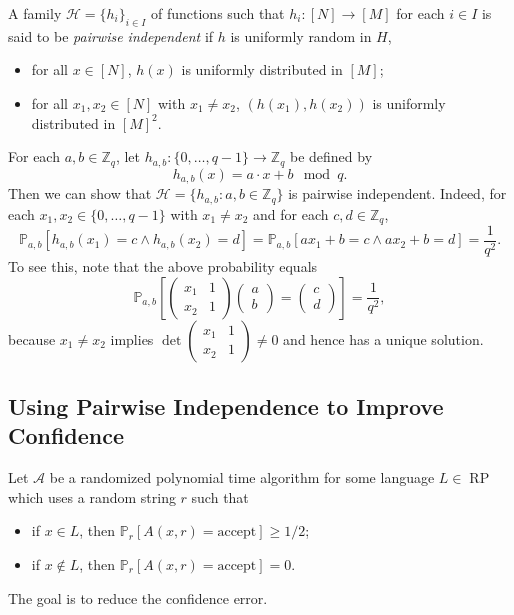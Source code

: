 \documentclass[letterpaper, reqno,11pt]{article}
\newcommand{\ZZ}{\mathbb{Z}}
\newcommand{\PP}{\mathbb{P}}
\DeclareMathOperator{\RP}{RP}
\begin{document}
\begin{definition}
  A family $\mathcal H = \{ h_i \}_{i \in I}$ of functions such that $h_i : [N] \to [M]$ for each $i \in I$ is said to be \emph{pairwise independent} if $h$ is uniformly random in $H$,
  \begin{itemize}[itemsep=0pt]
    \item for all $x \in [N]$, $h(x)$ is uniformly distributed in $[M]$;
    \item for all $x_1, x_2 \in [N]$ with $x_1 \neq x_2$, $(h(x_1), h(x_2))$ is uniformly distributed in $[M]^2$.
  \end{itemize}
\end{definition}

For each $a, b \in \ZZ_q$, let $h_{a, b} : \{ 0, \ldots, q - 1 \} \to \ZZ_q$ be defined by
$$ h_{a, b}(x) = a \cdot x + b \mod{q}. $$
Then we can show that $\mathcal H = \{ h_{a, b} : a, b \in \ZZ_q \}$ is pairwise independent. Indeed, for each $x_1, x_2 \in \{ 0, \ldots, q - 1 \}$ with $x_1 \neq x_2$ and for each $c, d \in \ZZ_q$,
$$ \PP_{a, b}\left[h_{a, b}\left(x_1\right) = c \wedge h_{a, b}\left(x_2\right) = d\right] = \PP_{a, b}\left[ax_1 + b = c \wedge ax_2 + b = d\right] = \frac{1}{q^2}. $$
To see this, note that the above probability equals
$$ \PP_{a, b}\left[\begin{pmatrix}
  x_1 & 1 \\
  x_2 & 1
\end{pmatrix} \begin{pmatrix}
  a \\
  b
\end{pmatrix} = \begin{pmatrix}
  c \\
  d
\end{pmatrix}\right] = \frac{1}{q^2}, $$
because $x_1 \neq x_2$ implies $\det \begin{pmatrix}
  x_1 & 1 \\
  x_2 & 1
\end{pmatrix} \neq 0$ and hence has a unique solution.

\subsection{Using Pairwise Independence to Improve Confidence}

Let $\mathcal A$ be a randomized polynomial time algorithm for some language $L \in \RP$ which uses a random string $r$ such that
\begin{itemize}[itemsep=0pt]
  \item if $x \in L$, then $\PP_r[A(x, r) = \text{accept}] \geq 1/2$;
  \item if $x \not \in L$, then $\PP_r[A(x, r) = \text{accept}] = 0$.
\end{itemize}
The goal is to reduce the confidence error.
\end{document}
